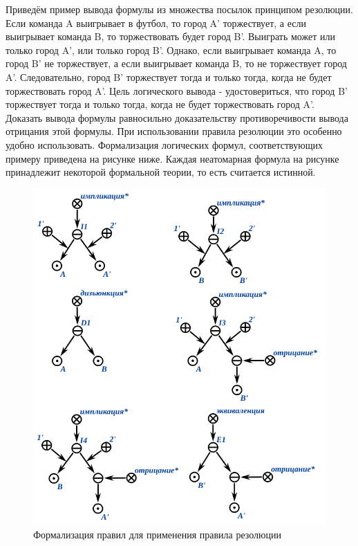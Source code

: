 Приведём пример вывода формулы из множества посылок принципом резолюции.
Если команда A выигрывает в футбол, то город A' торжествует, а если выигрывает команда B, то торжествовать будет город B'. Выиграть может или только город A', или только город B'. Однако, если выигрывает команда A, то город B' не торжествует, а если выигрывает команда B, то не торжествует город A'. Следовательно, город B' торжествует тогда и только тогда, когда не будет торжествовать город A'. Цель логического вывода - удостовериться, что город B' торжествует тогда и только тогда, когда не будет торжествовать город A'. Доказать вывода формулы равносильно доказательству противоречивости вывода отрицания этой формулы. При использовании правила резолюции это особенно удобно использовать.
Формализация логических формул, соответствующих примеру приведена на рисунке ниже. Каждая неатомарная формула на рисунке принадлежит некоторой формальной теории, то есть считается истинной.

\begin{figure}[H]
	\includegraphics[scale=0.8]{author/part3/figures/resolution_formulas_example.png}
	\caption{Формализация правил для применения правила резолюции}
	\label{fig:resolution_formulas}
\end{figure}

